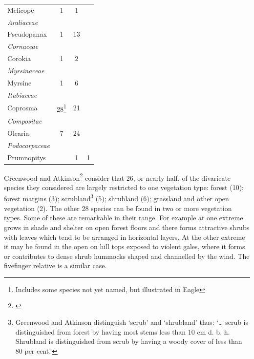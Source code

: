 \begin{xltabular}{\textwidth}{ X c c c }
    \hspace{3mm}Melicope & 1 & 1 \\
    \emph{Araliaceae} \\
    \hspace{3mm}Pseudopanax & 1 & 13 \\
    \emph{Cornaceae} \\
    \hspace{3mm}Corokia & 1 & 2 \\
    \emph{Myrsinaceae} \\
    \hspace{3mm}Myrsine & 1 & 6 \\
    \emph{Rubiaceae} \\
    \hspace{3mm}Coprosma
    & 28\footnote{Includes some species not yet named, but illustrated in Eagle}
    & 21 \\
    \emph{Compositae} \\
    \hspace{3mm}Olearia & 7 & 24 \\
    \emph{Podocarpaceae} \\
    \hspace{3mm}Prumnopitys &  & 1 & 1 \\
    \bottomrule
\end{xltabular}

Greenwood and Atkinson\footnote{\cite{greenwood1977evolution}} consider that 26, or nearly half, of the divaricate species they considered are largely restricted to one vegetation type: forest (10); forest margins (3); scrubland\footnote{Greenwood and Atkinson distinguish `scrub' and `shrubland' thus: `… scrub is distinguished from forest by having most stems less than 10 cm d. b. h. Shrubland is distinguished from scrub by having a woody cover of less than 80 per cent.'} (5); shrubland (6); grassland and other open vegetation (2).
The other 28 species can be found in two or more vegetation types.
Some of these are remarkable in their range.
For example  at one extreme grows in shade and shelter on open forest floors and there forms attractive shrubs with leaves which tend to be arranged in horizontal layers.
At the other extreme it may be found in the open on hill tops exposed to violent gales, where it forms or contributes to dense shrub hummocks shaped and channelled by the wind.
The fivefinger relative  is a similar case.

